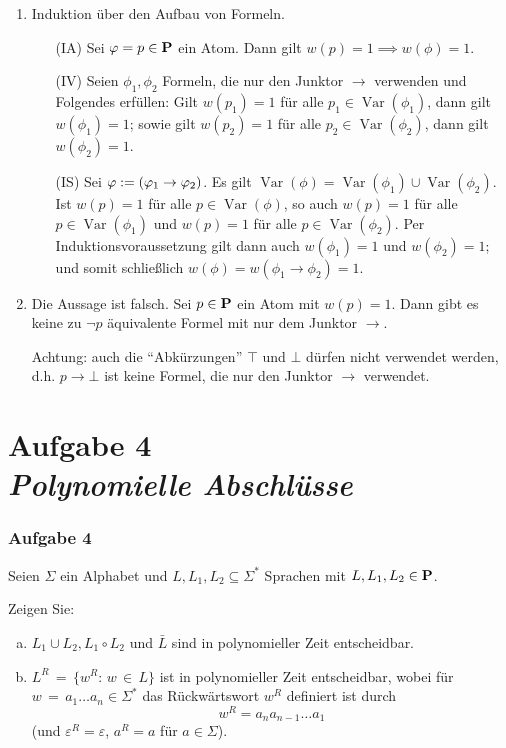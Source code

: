 \documentclass{beamer}
\DeclareMathOperator{\Var}{Var}
\begin{document}
	\begin{frame}
		\footnotesize 
		\begin{enumerate}[\bfseries (a)] \justifying
			\item Induktion über den Aufbau von Formeln.
			\begin{itemize} \footnotesize \justifying
				\item[(IA)] Sei $\varphi = p \in \textbf{\textcolor{black}{P}}$ ein Atom. Dann gilt $w(p) = 1 \implies w(\phi) = 1$.
				\item[(IV)] Seien $\phi_1, \phi_2$ Formeln, die nur den Junktor $\to$ verwenden und Folgendes erfüllen: Gilt $w(p_1) = 1$ für alle $p_1 \in \Var(\phi_1)$, dann gilt $w(\phi_1) = 1$; sowie gilt $w(p_2) = 1$ für alle $p_2 \in \Var(\phi_2)$, dann gilt $w(\phi_2) =  1$.
				\item[(IS)] Sei $\varphi \mathrel{:=} (\varphi_1 \to \varphi_2)$. Es gilt $\Var(\phi) = \Var(\phi_1) \cup \Var(\phi_2)$. Ist $w(p) = 1$ für alle $p \in \Var(\phi)$, so auch $w(p) = 1$ für alle $p \in \Var(\phi_1)$ und $w(p) = 1$ für alle $p \in \Var(\phi_2)$. Per Induktionsvoraussetzung gilt dann auch $w(\phi_1) = 1$ und $w(\phi_2) = 1$; und somit schließlich $w(\phi) = w(\phi_1 \to \phi_2) = 1$. 
			\end{itemize}
			\item Die Aussage ist falsch. Sei $p \in \textbf{\textcolor{black}{P}}$ ein Atom mit $w(p) = 1$. Dann gibt es keine zu $\lnot p$ äquivalente Formel mit nur dem Junktor $\to$. 
			
			Achtung: auch die \enquote{Abkürzungen} $\top$ und $\bot$ dürfen nicht verwendet werden, d.h. $p \to \bot$ ist keine Formel, die nur den Junktor $\to$ verwendet.
		\end{enumerate}
	\end{frame}

	\section{Aufgabe 4 \\ \itshape Polynomielle Abschlüsse}
	
	\begin{frame} \frametitle{Aufgabe 4}
		\small
		Seien $\Sigma$ ein Alphabet und $L, L_1, L_2 \subseteq \Sigma^\ast$ Sprachen mit $L, L_1, L_2 \in \textbf{\textcolor{black}{P}}$.
		
		Zeigen Sie:
		\begin{enumerate}[a)]
			\item		
			$L_1 \cup L_2, L_1 \circ L_2$ und $\bar{L}$ sind in polynomieller Zeit entscheidbar.
			
			\item $L^R \, = \, \{w^R :\, w \, \in \, L\}$ ist in polynomieller Zeit entscheidbar,
			wobei f\"ur $w \, = \, a_1 \dots a_n \in \Sigma^\ast$ das Rückwärtswort $w^R$ definiert ist durch 
			\[
			w^R = a_n a_{n-1} \dots a_1
			\]
			(und $\varepsilon^R = \varepsilon$, $a^R = a$ f\"ur $a \in \Sigma$).			
		\end{enumerate}
	\end{frame}
\end{document}

